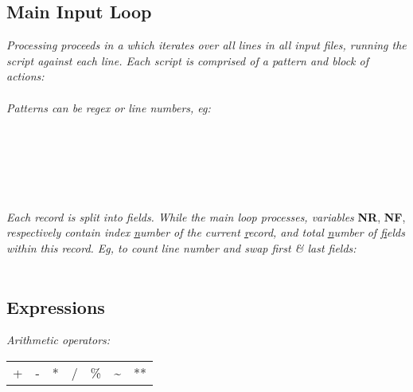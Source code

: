 \subsection*{Main Input Loop}
\textit{Processing proceeds in a  which iterates over all lines in all input files, running the script against each line. Each script  is comprised of a pattern and block of actions:}\\

\\

\textit{Patterns can be regex or line numbers, eg:}\\
\\
\\
\\
\\
\\
\\

\textit{Each record is split into fields. While the main loop processes, variables }\textbf{NR}, \textbf{NF}, \textit{respectively contain index \ul{n}umber of the current \ul{r}ecord, and total \ul{n}umber of \ul{f}ields within this record. Eg, to count line number and swap first \& last fields:}\\
\\



\subsection*{Expressions}

\textit{Arithmetic operators:}\\
\begin{tabular}{l l l l l l l}
    +	&
    -	&
    *	&
    /	&
    \%	&
    \textasciitilde	&
    **	\\
\end{tabular}




